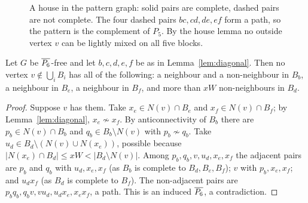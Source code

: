 \begin{figure}[ht]
\centering
{}
\caption{A house in the pattern graph: solid pairs are complete, dashed pairs are not complete. The four
dashed pairs $bc,cd,de,ef$ form a path, so the pattern is the complement of $P_5$. By the house lemma no
outside vertex $v$ can be lightly mixed on all five blocks.}
\label{fig:house}
\end{figure}

\begin{lemma}\label{lem:house}
Let $G$ be $\overline{P_6}$-free and let $b,c,d,e,f$ be as in Lemma~\ref{lem:diagonal}. Then no vertex
$v\notin\bigcup_iB_i$ has all of the following: a neighbour and a non-neighbour in $B_b$, a neighbour in
$B_e$, a neighbour in $B_f$, and more than $xW$ non-neighbours in $B_d$.
\end{lemma}
\begin{proof}
Suppose $v$ has them. Take $x_e\in N(v)\cap B_e$ and $x_f\in N(v)\cap B_f$; by Lemma~\ref{lem:diagonal},
$x_e\not\sim x_f$. By anticonnectivity of $B_b$ there are $p_b\in N(v)\cap B_b$ and $q_b\in B_b\setminus
N(v)$ with $p_b\not\sim q_b$. Take $u_d\in B_d\setminus(N(v)\cup N(x_e))$, possible because
$|N(x_e)\cap B_d|\le xW<|B_d\setminus N(v)|$. Among $p_b,q_b,v,u_d,x_e,x_f$ the adjacent pairs are $p_b$
and $q_b$ with $u_d,x_e,x_f$ (as $B_b$ is complete to $B_d,B_e,B_f$); $v$ with $p_b,x_e,x_f$; and $u_dx_f$ (as
$B_d$ is complete to $B_f$). The non-adjacent pairs are $p_bq_b,q_bv,vu_d,u_dx_e,x_ex_f$, a path. This is
an induced $\overline{P_6}$, a contradiction.
\end{proof}

